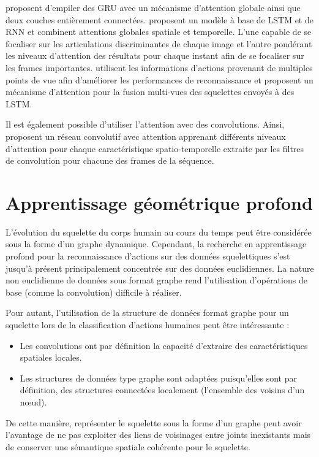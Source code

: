\cite{maghoumi2019deepgru} proposent d'empiler des GRU avec un mécanisme d'attention globale ainsi que deux couches entièrement connectées. \cite{song2017end} proposent un modèle à base de LSTM et de RNN et combinent attentions globales spatiale et temporelle. L'une capable de se focaliser sur les articulations discriminantes de chaque image et l’autre pondérant les niveaux d'attention des résultats pour chaque instant afin de se focaliser sur les frames importantes. \cite{Fan2019AttentionBasedMR} utilisent les informations d'actions provenant de multiples points de vue afin d'améliorer les performances de reconnaissance et proposent un mécanisme d'attention pour la fusion multi-vues des squelettes envoyés à des LSTM. 

Il est également possible d'utiliser l'attention avec des convolutions.
Ainsi, \cite{hou2018spatial} proposent un réseau convolutif avec attention apprenant différents niveaux d'attention pour chaque caractéristique spatio-temporelle extraite par les filtres de convolution pour chacune des frames de la séquence.


\section{Apprentissage géométrique profond}
L'évolution du squelette du corps humain au cours du temps peut être considérée sous la forme d'un graphe dynamique. Cependant, la recherche en apprentissage profond pour la reconnaissance d'actions sur des données squelettiques s'est jusqu'à présent principalement concentrée sur des données euclidiennes.
La nature non euclidienne de données sous format graphe rend l'utilisation d'opérations de base (comme la convolution) difficile à réaliser. 

Pour autant, l'utilisation de la structure de données format graphe pour un squelette lors de la classification d'actions humaines peut être intéressante :

\begin{itemize}
    \item Les convolutions ont par définition la capacité d'extraire des caractéristiques spatiales locales.
    \item Les structures de données type graphe sont adaptées puisqu'elles sont par définition, des structures connectées localement (l’ensemble des voisins d’un nœud).
\end{itemize}
 De cette manière, représenter le squelette sous la forme d'un graphe peut avoir l'avantage de ne pas exploiter des liens de voisinages entre joints inexistants mais de conserver une sémantique spatiale cohérente pour le squelette.

